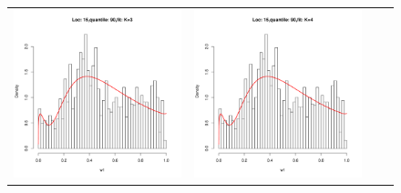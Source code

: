 \begin{figure}[h]
\begin{tabular}{cccc}
\includegraphics[width=\textwidth/4]{../img/loc15/quantile90/fit_K3_BFGS.pdf}
&
\includegraphics[width=\textwidth/4]{../img/loc15/quantile90/fit_K4_BFGS.pdf}
&

\end{tabular}
\end{figure}
